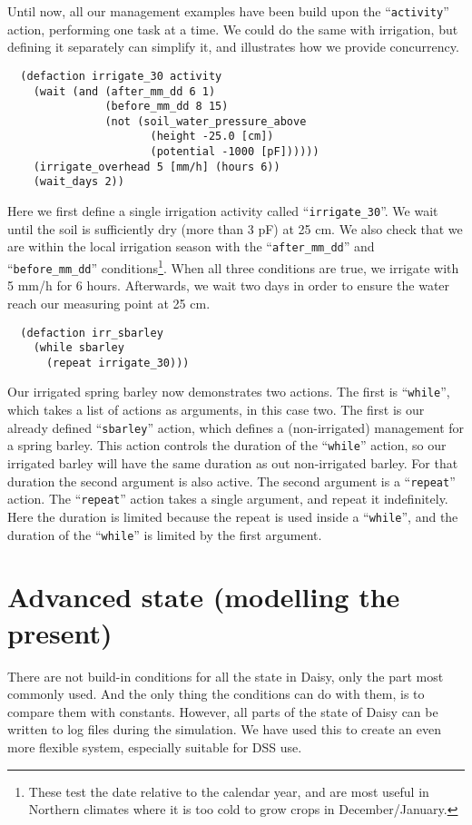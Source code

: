 \documentclass[a4paper]{article}
\newcommand{\dname}[1]{``\texttt{#1}''}
\begin{document}
Until now, all our management examples have been build upon the
\dname{activity} action, performing one task at a time.  We could
do the same with irrigation, but defining it separately can simplify
it, and illustrates how we provide concurrency.
\begin{verbatim}
  (defaction irrigate_30 activity 
    (wait (and (after_mm_dd 6 1)
               (before_mm_dd 8 15)
               (not (soil_water_pressure_above 
                      (height -25.0 [cm])
                      (potential -1000 [pF])))))
    (irrigate_overhead 5 [mm/h] (hours 6))
    (wait_days 2))
\end{verbatim}
Here we first define a single irrigation activity called
\dname{irrigate\_30}.  We wait until the soil is sufficiently dry
(more than 3 pF) at 25 cm.  We also check that we are within the local
irrigation season with the \dname{after\_mm\_dd} and
\dname{before\_mm\_dd} conditions\footnote{These test the date
  relative to the calendar year, and are most useful in Northern
  climates where it is too cold to grow crops in December/January.}.
When all three conditions are true, we irrigate with 5 mm/h for 6
hours.  Afterwards, we wait two days in order to ensure the water
reach our measuring point at 25 cm.
\begin{verbatim}
  (defaction irr_sbarley
    (while sbarley
      (repeat irrigate_30)))
\end{verbatim}
Our irrigated spring barley now demonstrates two actions.  The first
is \dname{while}, which takes a list of actions as arguments, in this
case two.  The first is our already defined \dname{sbarley} action,
which defines a (non-irrigated) management for a spring barley.  This
action controls the duration of the \dname{while} action, so our
irrigated barley will have the same duration as out non-irrigated
barley.  For that duration the second argument is also active.  The
second argument is a \dname{repeat} action.  The \dname{repeat} action
takes a single argument, and repeat it indefinitely.  Here the
duration is limited because the repeat is used inside a \dname{while}, and
the duration of the \dname{while} is limited by the first
argument.

\section{Advanced state (modelling the present)} 

There are not build-in conditions for all the state in Daisy, only the
part most commonly used.  And the only thing the conditions can do
with them, is to compare them with constants.  However, all parts of
the state of Daisy can be written to log files during the simulation.
We have used this to create an even more flexible system, especially
suitable for DSS use.
\end{document}
